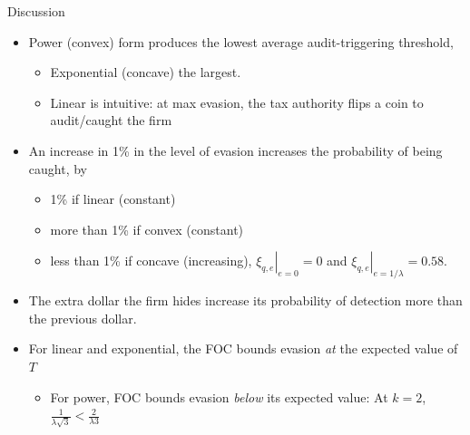 \documentclass[
  ignorenonframetext,
  aspectratio=169,
]{beamer}
\providecommand{\tightlist}{%
  \setlength{\itemsep}{0pt}\setlength{\parskip}{0pt}}
\begin{document}
\begin{frame}{Discussion}
\protect{}\label{discussion}
\begin{itemize}
\tightlist
\item
  Power (convex) form produces the lowest average audit-triggering
  threshold,

  \begin{itemize}
  \tightlist
  \item
    Exponential (concave) the largest.
  \item
    Linear is intuitive: at max evasion, the tax authority flips a coin
    to audit/caught the firm
  \end{itemize}
\item
  An increase in 1\% in the level of evasion increases the probability
  of being caught, by

  \begin{itemize}
  \tightlist
  \item
    1\% if linear (constant)
  \item
    more than 1\% if convex (constant)
  \item
    less than 1\% if concave (increasing),
    \(\left.\xi_{q,e}\right|_{e=0}=0\) and
    \(\left.\xi_{q,e}\right|_{e=1/\lambda}=0.58\).
  \end{itemize}
\item
  The extra dollar the firm hides increase its probability of detection
  more than the previous dollar.
\item
  For linear and exponential, the FOC bounds evasion \emph{at} the
  expected value of \(T\)

  \begin{itemize}
  \tightlist
  \item
    For power, FOC bounds evasion \emph{below} its expected value: At
    \(k=2\), \(\frac{1}{\lambda \sqrt{3}}<\frac{2}{\lambda 3}\)
  \end{itemize}
\end{itemize}
\end{frame}
\end{document}
